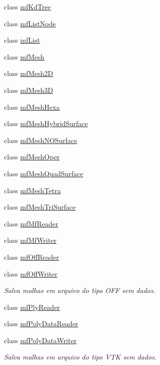 \begin{DoxyCompactItemize}
\item 
class \hyperlink{classmf_1_1mfKdTree}{mfKdTree}
\item 
class \hyperlink{classmf_1_1mfListNode}{mfListNode}
\item 
class \hyperlink{classmf_1_1mfList}{mfList}
\item 
class \hyperlink{classmf_1_1mfMesh}{mfMesh}
\item 
class \hyperlink{classmf_1_1mfMesh2D}{mfMesh2D}
\item 
class \hyperlink{classmf_1_1mfMesh3D}{mfMesh3D}
\item 
class \hyperlink{classmf_1_1mfMeshHexa}{mfMeshHexa}
\item 
class \hyperlink{classmf_1_1mfMeshHybridSurface}{mfMeshHybridSurface}
\item 
class \hyperlink{classmf_1_1mfMeshNOSurface}{mfMeshNOSurface}
\item 
class \hyperlink{classmf_1_1mfMeshOper}{mfMeshOper}
\item 
class \hyperlink{classmf_1_1mfMeshQuadSurface}{mfMeshQuadSurface}
\item 
class \hyperlink{classmf_1_1mfMeshTetra}{mfMeshTetra}
\item 
class \hyperlink{classmf_1_1mfMeshTriSurface}{mfMeshTriSurface}
\item 
class \hyperlink{classmf_1_1mfMfReader}{mfMfReader}
\item 
class \hyperlink{classmf_1_1mfMfWriter}{mfMfWriter}
\item 
class \hyperlink{classmf_1_1mfOffReader}{mfOffReader}
\item 
class \hyperlink{classmf_1_1mfOffWriter}{mfOffWriter}
\begin{DoxyCompactList}\small\item\em Salva malhas em arquivo do tipo OFF sem dados. \item\end{DoxyCompactList}\item 
class \hyperlink{classmf_1_1mfPlyReader}{mfPlyReader}
\item 
class \hyperlink{classmf_1_1mfPolyDataReader}{mfPolyDataReader}
\item 
class \hyperlink{classmf_1_1mfPolyDataWriter}{mfPolyDataWriter}
\begin{DoxyCompactList}\small\item\em Salva malhas em arquivo do tipo VTK sem dados. \item\end{DoxyCompactList}\item 

\end{DoxyCompactItemize}
